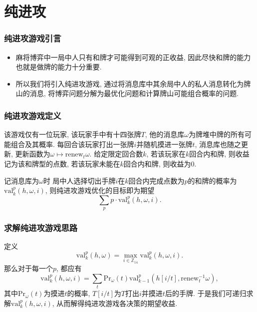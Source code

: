 \documentclass{ctexbeamer}
\newcommand{\hand}{h}
\newcommand{\base}{\omega}
\newcommand{\prob}{\mathrm{Pr}}
\begin{document}
	\section{纯进攻}

	\begin{frame}
		\frametitle{纯进攻游戏引言}
		\begin{itemize}
			\item 麻将博弈中一局中人只有和牌才可能得到可观的正收益,
				因此尽快和牌的能力也就是做牌的能力十分重要.
			\item 所以我们将引入纯进攻游戏,
				通过将消息库中其余局中人的私人消息转化为牌山的消息,
				将博弈问题分解为最优化问题和计算牌山可能组合概率的问题.
		\end{itemize}
	\end{frame}

	\begin{frame}
		\frametitle{纯进攻游戏定义}
		\begin{definition}[纯进攻游戏]
			该游戏仅有一位玩家, 该玩家手中有十四张牌$T$,
			他的消息库$\base$为牌堆中牌的所有可能组合及其概率.
			每回合该玩家打出一张牌$i$并随机摸进一张牌$t$, 消息库也随之更新,
			更新函数为$\base\mapsto\mathrm{renew}_t{\base}$.
			给定限定回合数$k$,
			若该玩家在$k$回合内和牌, 则收益记为该和牌型的点数,
			若该玩家未能在$k$回合内和牌, 则收益为0.
		\end{definition}
		记消息库为$\base$时
		局中人选择切出手牌$i$在$k$回合内完成点数为$p$的和牌的概率为
		$\mathrm{val}_{k}^{p}(\hand, \base, i)$,
		则纯进攻游戏优化的目标即为期望
		\[\sum_{p}{p\cdot\mathrm{val}_{k}^{p}(\hand, \base, i)}.\]
	\end{frame}

	\begin{frame}
		\frametitle{求解纯进攻游戏思路}
		定义
		\[\mathrm{val}_{k}^{p}(\hand, \base)=
		\max_{i\in\mathbb{Z}_{14}}{\mathrm{val}_{k}^{p}(\hand, \base, i)}.\]
		那么对于每一个$p$, 都应有
		\[\mathrm{val}_{k}^{p}(\hand, \base, i)=
		\sum_{t}{\prob_{\base}}(t)\mathrm{val}_{k-1}^{p}(\hand[i/t],
		\mathrm{renew}_{t}^{-1}{\base}),\]
		其中$\prob_{\base}(t)$为摸进$t$的概率,
		$T[i/t]$为$T$打出$i$并摸进$t$后的手牌.
		于是我们可递归求解$\mathrm{val}_{k}^{p}(\hand, \base, i)$,
		从而解得纯进攻游戏各决策的期望收益.
	\end{frame}
\end{document}
